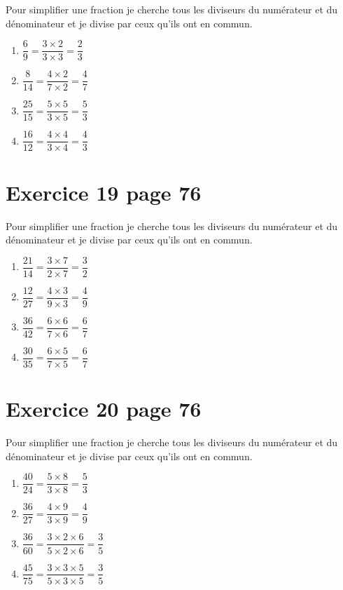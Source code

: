 \documentclass[12pt,a4paper]{article}
\begin{document}
Pour simplifier une fraction je cherche tous les diviseurs du numérateur et du dénominateur et je divise par ceux qu'ils ont en commun.
\begin{multicols}{2}
	
	
	\begin{enumerate}
		\item $\dfrac{6}{9} = \dfrac{3 \times 2}{3 \times 3} = \dfrac{2}{3}$ 
		\item $\dfrac{8}{14} = \dfrac{4 \times 2}{7 \times 2} = \dfrac{4}{7}$ 
		\item $\dfrac{25}{15} = \dfrac{5 \times 5}{3 \times 5} = \dfrac{5}{3}$ 
		\item $\dfrac{16}{12} = \dfrac{4 \times 4}{3 \times 4} = \dfrac{4}{3}$ 
	\end{enumerate}
	
\end{multicols}

\section*{Exercice 19 page 76}

Pour simplifier une fraction je cherche tous les diviseurs du numérateur et du dénominateur et je divise par ceux qu'ils ont en commun.
\begin{multicols}{2}
	
	
	\begin{enumerate}
		\item $\dfrac{21}{14} = \dfrac{3 \times 7}{2 \times 7} = \dfrac{3}{2}$ 
		\item $\dfrac{12}{27} = \dfrac{4 \times 3}{9 \times 3} = \dfrac{4}{9}$ 
		\item $\dfrac{36}{42} = \dfrac{6 \times 6}{7 \times 6} = \dfrac{6}{7}$ 
		\item $\dfrac{30}{35} = \dfrac{6 \times 5}{7 \times 5} = \dfrac{6}{7}$ 
	\end{enumerate}
	
\end{multicols}

\section*{Exercice 20 page 76}

Pour simplifier une fraction je cherche tous les diviseurs du numérateur et du dénominateur et je divise par ceux qu'ils ont en commun.
\begin{multicols}{2}
	
	
	\begin{enumerate}
		\item $\dfrac{40}{24} = \dfrac{5 \times 8}{3 \times 8} = \dfrac{5}{3}$ 
		\item $\dfrac{36}{27} = \dfrac{4 \times 9}{3 \times 9} = \dfrac{4}{9}$ 
		\item $\dfrac{36}{60} = \dfrac{3 \times 2 \times 6}{5 \times 2 \times 6} = \dfrac{3}{5}$ 
		\item $\dfrac{45}{75} = \dfrac{3 \times 3 \times 5}{5 \times 3 \times 5} = \dfrac{3}{5}$ 
	\end{enumerate}
	
\end{multicols}
\end{document}
